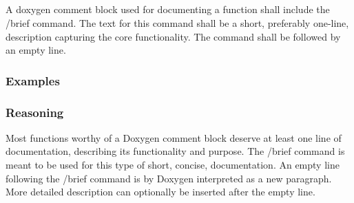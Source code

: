 \subsection*{\doxygenRule{}}

A doxygen comment block used for documenting a function shall include the /brief command. The text for this command shall be a short, preferably one-line, description capturing the core functionality. The command shall be followed by an empty line.

\subsubsection*{Examples}

\noindent
\begin{minipage}[t]{0.47\textwidth}
    
\end{minipage}\hfill
\begin{minipage}[t]{0.47\textwidth}
    
\end{minipage}

\subsubsection*{Reasoning}

 Most functions worthy of a Doxygen comment block deserve at least one line of documentation, describing its functionality and purpose. The /brief command is meant to be used for this type of short, concise, documentation. An empty line following the /brief command is by Doxygen interpreted as a new paragraph. More detailed description can optionally be inserted after the empty line.
